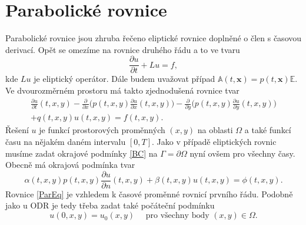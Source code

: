 \documentclass[a4paper,10pt]{article}
\def\vc#1{\mathbf{\boldsymbol{#1}}}     %
\def\tn#1{{\mathbb{#1}}}    %
\def\prtl{\partial}                                        %
\begin{document}
\section{Parabolické rovnice}
Parabolické rovnice jsou zhruba řečeno eliptické rovnice doplněné o člen s časovou derivací.
Opět se omezíme na rovnice druhého řádu a to ve tvaru
\[
   \frac{\prtl u}{\prtl t}+Lu=f,
\]
kde $Lu$ je eliptický operátor. Dále budem uvažovat případ $\tn A(t,\vc x)=p(t,\vc x)\tn E$. 
 Ve dvourozměrném prostoru má takto zjednodušená rovnice tvar
\begin{multline}\label{ParEq}
 \frac{\prtl u}{\prtl t}(t,x,y)-\frac{\prtl}{\prtl x}\Big(p(t,x,y)\frac{\prtl u}{\prtl x}(t,x,y)\Big)
  -\frac{\prtl}{\prtl y}\Big(p(t,x,y)\frac{\prtl u}{\prtl y}(t,x,y)\Big)\\ 
    +q(t,x,y)u(t,x,y)=f(t,x,y).
\end{multline}
Řešení $u$ je funkcí prostorových proměnných $(x,y)$ na oblasti $\Omega$ a také funkcí času na 
nějakém daném intervalu $[0,T]$.
Jako v případě eliptických rovnic musíme zadat okrajové podmínky \eqref{BC} na $\Gamma=\prtl\Omega$ nyní ovšem
pro všechny časy. Obecně má okrajová podmínka tvar
\[
  \alpha(t,x,y)p(t,x,y)\frac{\prtl u}{\prtl n}(t,x,y)+\beta(t,x,y) u(t,x,y)=\phi(t,x,y).
\]
Rovnice \eqref{ParEq} je vzhledem k časové proměnné rovnicí prvního řádu. Podobně jako u ODR je tedy třeba zadat také počáteční podmínku
\[
   u(0,x,y)=u_0(x,y)\quad\text{ pro všechny body }(x,y)\in\Omega.
\]
\end{document}
